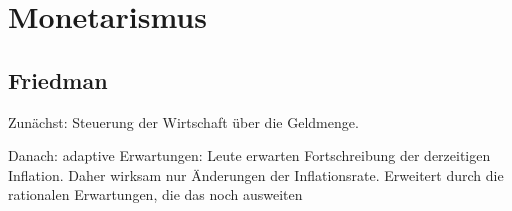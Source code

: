 %
%
%

\chapter{Monetarismus}
\label{Monetarismus}

\section{Friedman}

Zunächst: Steuerung der Wirtschaft über die Geldmenge.

Danach: adaptive Erwartungen: Leute erwarten Fortschreibung der derzeitigen Inflation. Daher wirksam nur Änderungen der Inflationsrate. Erweitert durch die rationalen Erwartungen, die das noch ausweiten
